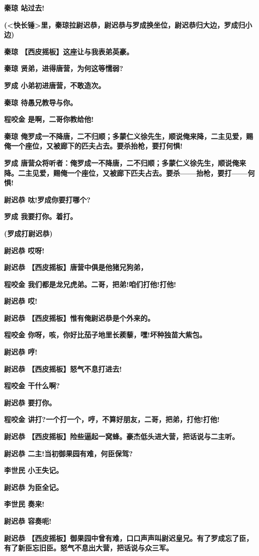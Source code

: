 \textbf{秦琼 站过去!}

\textbf{(\textless{}快长锤\textgreater{}里，秦琼拉尉迟恭，尉迟恭与罗成换坐位，尉迟恭归大边，罗成归小边)}

\textbf{秦琼 【西皮摇板】这座让与我表弟英豪。}

\textbf{秦琼 贤弟，进得唐营，为何这等懦弱?}

\textbf{罗成 小弟初进唐营，不敢造次。}

\textbf{秦琼 待愚兄教导与你。}

\textbf{程咬金 是啊，二哥你教给他!}

\textbf{秦琼
俺罗成一不降唐，二不归顺；多蒙仁义徐先生，顺说俺来降，二主见爱，赐俺一个座位，又被廊下的匹夫占去。要杀抬枪，要打何惧!}

\textbf{罗成
唐营众将听者：俺罗成一不降唐，二不归顺；多蒙仁义徐先生，顺说俺来降。二主见爱，赐俺一个座位，又被廊下匹夫占去。要杀------抬枪，要打------何惧!}

\textbf{尉迟恭 呔!罗成你要打哪个?}

\textbf{罗成 我要打你。着打。}

\textbf{(罗成打尉迟恭)}

\textbf{尉迟恭 哎呀!}

\textbf{尉迟恭 【西皮摇板】唐营中俱是他猪兄狗弟，}

\textbf{程咬金 我们都是龙兄虎弟。二哥，把弟!咱们打他!打他!}

\textbf{尉迟恭 哎!}

\textbf{尉迟恭 【西皮摇板】惟有俺尉迟恭是个外来的。}

\textbf{程咬金 你呀，咳，你好比茄子地里长蒺藜，嘿!坏种独苗大紫包。}

\textbf{尉迟恭 哼!}

\textbf{尉迟恭 【西皮摇板】怒气不息打进去!}

\textbf{程咬金 干什么啊?}

\textbf{尉迟恭 要打你。}

\textbf{程咬金 讲打?一个打一个，哼，不算好朋友，二哥，把弟，打他!打他!}

\textbf{尉迟恭
【西皮摇板】险些逼起一窝蜂。豪杰低头进大营，把话说与二主听。}

\textbf{尉迟恭 二主!当初御果园有难，何臣保驾?}

\textbf{李世民 小王失记。}

\textbf{尉迟恭 为臣全记。}

\textbf{李世民 奏来!}

\textbf{尉迟恭 容奏呃!}

\textbf{尉迟恭
【西皮摇板】御果园中曾有难，口口声声叫尉迟皇兄。有了罗成忘了臣，有了新臣忘旧臣。怒气不息出大营，把话说与众三军。}

